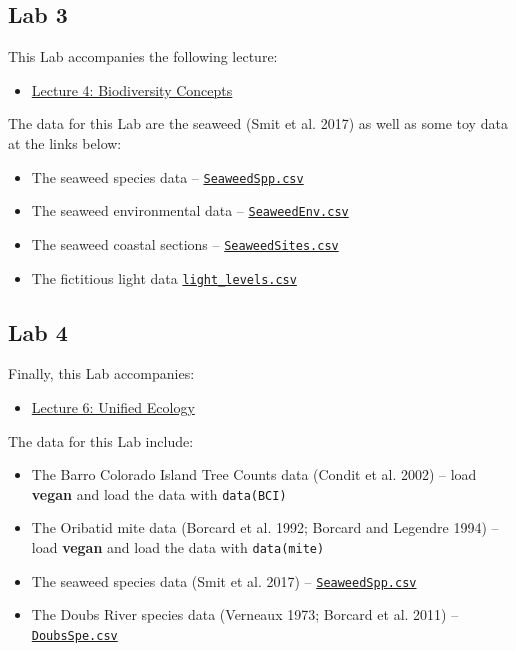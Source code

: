 \documentclass[
  12pt,
]{book}
\providecommand{\tightlist}{%
  \setlength{\itemsep}{0pt}\setlength{\parskip}{0pt}}
\let\oldtexttt\texttt
\renewcommand{\texttt}[1]{\oldtexttt{\small #1}}
\begin{document}
\subsection{Lab 3}\label{lab-3}

This Lab accompanies the following lecture:

\begin{itemize}
\tightlist
\item
  \href{Lec-04-biodiversity.qmd}{Lecture 4: Biodiversity Concepts}
\end{itemize}

The data for this Lab are the seaweed (Smit et al. 2017) as well as some
toy data at the links below:

\begin{itemize}
\tightlist
\item
  The seaweed species data --
  \href{../data/seaweed/SeaweedSpp.csv}{\texttt{SeaweedSpp.csv}}
\item
  The seaweed environmental data --
  \href{../data/seaweed/SeaweedEnv.csv}{\texttt{SeaweedEnv.csv}}
\item
  The seaweed coastal sections --
  \href{../data/seaweed/SeaweedSites.csv}{\texttt{SeaweedSites.csv}}
\item
  The fictitious light data
  \href{../data/light_levels.csv}{\texttt{light\_levels.csv}}
\end{itemize}

\subsection{Lab 4}\label{lab-4}

Finally, this Lab accompanies:

\begin{itemize}
\tightlist
\item
  \href{Lec-06-unified-ecology.qmd}{Lecture 6: Unified Ecology}
\end{itemize}

The data for this Lab include:

\begin{itemize}
\tightlist
\item
  The Barro Colorado Island Tree Counts data (Condit et al. 2002) --
  load \textbf{vegan} and load the data with \texttt{data(BCI)}
\item
  The Oribatid mite data (Borcard et al. 1992; Borcard and Legendre
  1994) -- load \textbf{vegan} and load the data with
  \texttt{data(mite)}
\item
  The seaweed species data (Smit et al. 2017) --
  \href{../data/seaweed/SeaweedSpp.csv}{\texttt{SeaweedSpp.csv}}
\item
  The Doubs River species data (Verneaux 1973; Borcard et al. 2011) --
  \href{../data/DoubsSpe.csv}{\texttt{DoubsSpe.csv}}
\end{itemize}
\end{document}
